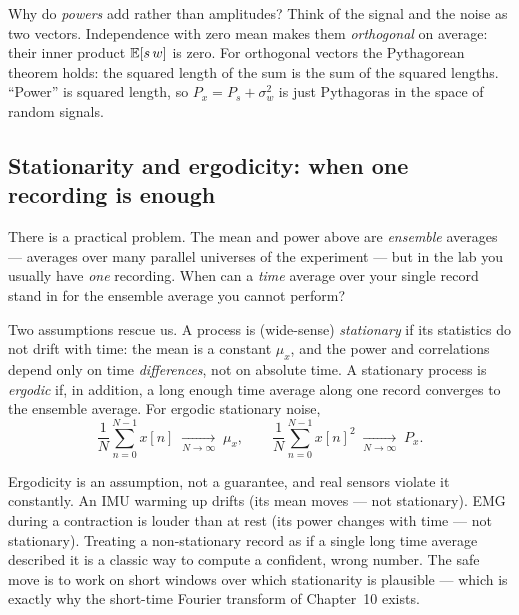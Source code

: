 \begin{whybox}
Why do \emph{powers} add rather than amplitudes? Think of the signal
and the noise as two vectors. Independence with zero mean makes them
\emph{orthogonal} on average: their inner product $\operatorname{\mathbb{E}}[s\,w]$ is zero. For
orthogonal vectors the Pythagorean theorem holds: the squared length of the
sum is the sum of the squared lengths. ``Power'' is squared length, so
$P_x = P_s + \sigma_w^2$ is just Pythagoras in the space of random signals.

\begin{center}
\end{center}
\end{whybox}

\subsection{Stationarity and ergodicity: when one recording is enough}

There is a practical problem. The mean and power above are
\emph{ensemble} averages --- averages over many parallel universes of the
experiment --- but in the lab you usually have \emph{one} recording. When can a
\emph{time} average over your single record stand in for the ensemble average you
cannot perform?

Two assumptions rescue us. A process is (wide-sense) \emph{stationary} if its
statistics do not drift with time: the mean is a constant $\mu_x$, and the power
and correlations depend only on time \emph{differences}, not on absolute time. A
stationary process is \emph{ergodic} if, in addition, a long enough time average
along one record converges to the ensemble average. For ergodic stationary noise,
\[
  \frac{1}{N}\sum_{n=0}^{N-1} x[n] \;\xrightarrow[N\to\infty]{}\; \mu_x,
  \qquad
  \frac{1}{N}\sum_{n=0}^{N-1} x[n]^2 \;\xrightarrow[N\to\infty]{}\; P_x.
\]

\begin{trapbox}
Ergodicity is an assumption, not a guarantee, and real sensors violate it
constantly. An IMU warming up drifts (its mean moves --- not stationary). EMG
during a contraction is louder than at rest (its power changes with time --- not
stationary). Treating a non-stationary record as if a single long time average
described it is a classic way to compute a confident, wrong number. The safe
move is to work on short windows over which stationarity is plausible --- which is
exactly why the short-time Fourier transform of Chapter~10 exists.
\end{trapbox}

